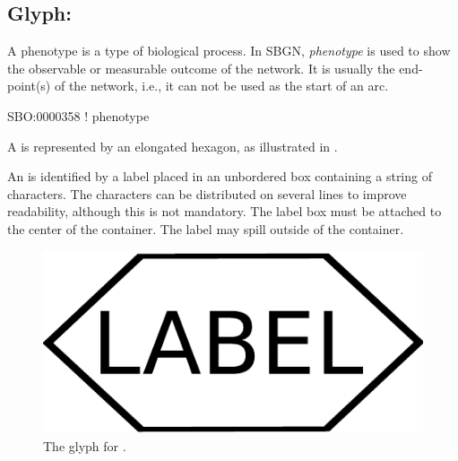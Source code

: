 \subsection{Glyph: }
\label{sec:af:phenotype}

A phenotype is a type of biological process.  In SBGN, \emph{phenotype} is used to show the observable or measurable outcome of the network.  It is usually the end-point(s) of the network, i.e., it can not be used as the start of an arc.

\begin{glyphDescription}

\glyphSboTerm
SBO:0000358 ! phenotype

\glyphContainer A  is represented by an elongated hexagon, as illustrated in .

\glyphLabel An  is identified by a label placed in an unbordered box containing a string of characters.  The characters can be distributed on several lines to improve readability, although this is not mandatory.  The label box must be attached to the center of the  container.  The label may spill outside of the container.

\end{glyphDescription}

\begin{figure}[H]
  \centering
  \includegraphics[scale = 0.4]{images/phenotype}
  \caption{The \AF glyph for .}
  \label{fig:af:phenotype}
\end{figure}
